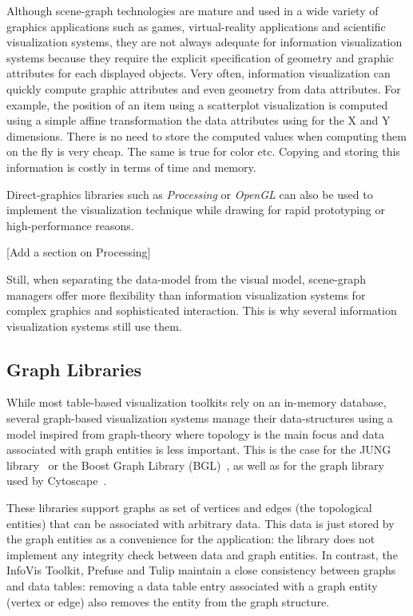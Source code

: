 Although scene-graph technologies are mature and used in a wide
variety of graphics applications such as games, virtual-reality
applications and scientific visualization systems, they are not always
adequate for information visualization systems because they require
the explicit specification of geometry and graphic attributes for each
displayed objects.  Very often, information visualization can quickly
compute graphic attributes and even geometry from data attributes.
For example, the position of an item using a scatterplot visualization
is computed using a simple affine transformation the data attributes
using for the X and Y dimensions.  There is no need to store the
computed values when computing them on the fly is very cheap.  The
same is true for color etc.  Copying and storing this information is
costly in terms of time and memory.

Direct-graphics libraries such as \emph{Processing} or \emph{OpenGL}
can also be used to implement the visualization technique while
drawing for rapid prototyping or high-performance reasons.

[Add a section on Processing]

Still, when separating the data-model from the visual model,
scene-graph managers offer more flexibility than information
visualization systems for complex graphics and sophisticated
interaction.  This is why several information visualization systems
still use them.


\subsection{Graph Libraries}

While most table-based visualization toolkits rely on an in-memory
database, several graph-based visualization systems manage their
data-structures using a model inspired from graph-theory where
topology is the main focus and data associated with graph entities is
less important.  This is the case for the JUNG library~\cite{jung2003}
or the Boost Graph Library (BGL)~\cite{BGL}, as well as for the graph
library used by Cytoscape~\cite{Cytoscape}.

These libraries support graphs as set of vertices and edges (the
topological entities) that can be associated with arbitrary data.
This data is just stored by the graph entities as a convenience for
the application: the library does not implement any integrity check
between data and graph entities.  In contrast, the InfoVis Toolkit,
Prefuse and Tulip maintain a close consistency between graphs and data
tables: removing a data table entry associated with a graph entity
(vertex or edge) also removes the entity from the graph structure.

